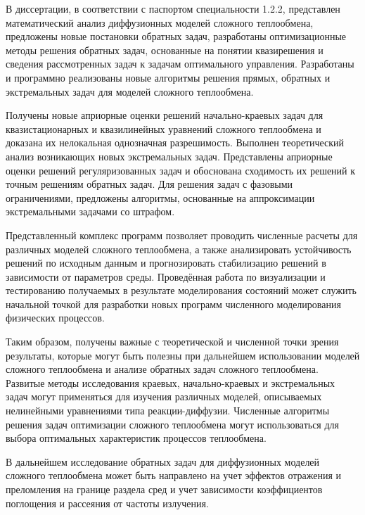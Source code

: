 В диссертации, в соответствии с паспортом специальности 1.2.2, представлен
математический анализ диффузионных моделей сложного теплообмена,
предложены новые постановки обратных задач, разработаны
оптимизационные методы решения обратных задач, основанные на понятии
квазирешения и сведения рассмотренных задач к задачам оптимального
управления.
Разработаны и программно реализованы новые алгоритмы
решения прямых, обратных и экстремальных задач для моделей сложного
теплообмена.


Получены новые априорные оценки решений начально-краевых задач для
квазистационарных и квазилинейных уравнений сложного теплообмена и
доказана их нелокальная однозначная разрешимость.
Выполнен теоретический анализ возникающих новых экстремальных задач.
Представлены априорные оценки решений регуляризованных задач и
обоснована сходимость их решений к точным решениям обратных задач.
Для решения задач с фазовыми ограничениями, предложены алгоритмы,
основанные на аппроксимации экстремальными задачами со штрафом.


Представленный комплекс программ позволяет проводить численные расчеты для
различных моделей сложного теплообмена, а также анализировать устойчивость
решений по исходным данным и прогнозировать стабилизацию решений
в зависимости от параметров среды.
Проведённая работа по визуализации и тестированию получаемых
в результате моделирования состояний может служить начальной точкой для
разработки новых программ численного моделирования физических процессов.


Таким образом, получены важные с теоретической и численной точки зрения
результаты, которые могут быть полезны при дальнейшем использовании
моделей сложного теплообмена и анализе обратных задач сложного
теплообмена.
Развитые методы исследования краевых, начально-краевых и
экстремальных задач могут применяться для изучения различных моделей,
описываемых нелинейными уравнениями типа реакции-диффузии.
Численные алгоритмы решения задач оптимизации сложного теплообмена
могут использоваться для выбора оптимальных характеристик процессов
теплообмена.

В дальнейшем исследование обратных задач для диффузионных моделей
сложного теплообмена может быть направлено на учет эффектов отражения
и преломления на границе раздела сред и учет зависимости коэффициентов
поглощения и рассеяния от частоты излучения.

